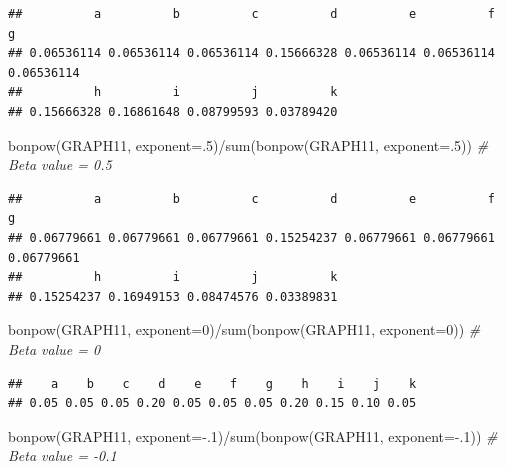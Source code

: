 \documentclass[
  notitlepage,
  onecolumn,
  openany]{book}
\newenvironment{Shaded}{\begin{snugshade}}{\end{snugshade}}
\newcommand{\AttributeTok}[1]{\textcolor[rgb]{0.77,0.63,0.00}{#1}}
\newcommand{\CommentTok}[1]{\textcolor[rgb]{0.56,0.35,0.01}{\textit{#1}}}
\newcommand{\DecValTok}[1]{\textcolor[rgb]{0.00,0.00,0.81}{#1}}
\newcommand{\FunctionTok}[1]{\textcolor[rgb]{0.00,0.00,0.00}{#1}}
\newcommand{\NormalTok}[1]{#1}
\newcommand{\SpecialCharTok}[1]{\textcolor[rgb]{0.00,0.00,0.00}{#1}}
\begin{document}
\begin{verbatim}
##          a          b          c          d          e          f          g 
## 0.06536114 0.06536114 0.06536114 0.15666328 0.06536114 0.06536114 0.06536114 
##          h          i          j          k 
## 0.15666328 0.16861648 0.08799593 0.03789420
\end{verbatim}

\begin{Shaded}
\begin{Highlighting}[]
\FunctionTok{bonpow}\NormalTok{(GRAPH11, }\AttributeTok{exponent=}\NormalTok{.}\DecValTok{5}\NormalTok{)}\SpecialCharTok{/}\FunctionTok{sum}\NormalTok{(}\FunctionTok{bonpow}\NormalTok{(GRAPH11, }\AttributeTok{exponent=}\NormalTok{.}\DecValTok{5}\NormalTok{)) }\CommentTok{\# Beta value = 0.5}
\end{Highlighting}
\end{Shaded}

\begin{verbatim}
##          a          b          c          d          e          f          g 
## 0.06779661 0.06779661 0.06779661 0.15254237 0.06779661 0.06779661 0.06779661 
##          h          i          j          k 
## 0.15254237 0.16949153 0.08474576 0.03389831
\end{verbatim}

\begin{Shaded}
\begin{Highlighting}[]
\FunctionTok{bonpow}\NormalTok{(GRAPH11, }\AttributeTok{exponent=}\DecValTok{0}\NormalTok{)}\SpecialCharTok{/}\FunctionTok{sum}\NormalTok{(}\FunctionTok{bonpow}\NormalTok{(GRAPH11, }\AttributeTok{exponent=}\DecValTok{0}\NormalTok{)) }\CommentTok{\# Beta value = 0}
\end{Highlighting}
\end{Shaded}

\begin{verbatim}
##    a    b    c    d    e    f    g    h    i    j    k 
## 0.05 0.05 0.05 0.20 0.05 0.05 0.05 0.20 0.15 0.10 0.05
\end{verbatim}

\begin{Shaded}
\begin{Highlighting}[]
\FunctionTok{bonpow}\NormalTok{(GRAPH11, }\AttributeTok{exponent=}\SpecialCharTok{{-}}\NormalTok{.}\DecValTok{1}\NormalTok{)}\SpecialCharTok{/}\FunctionTok{sum}\NormalTok{(}\FunctionTok{bonpow}\NormalTok{(GRAPH11, }\AttributeTok{exponent=}\SpecialCharTok{{-}}\NormalTok{.}\DecValTok{1}\NormalTok{)) }\CommentTok{\# Beta value = {-}0.1}
\end{Highlighting}
\end{Shaded}
\end{document}
